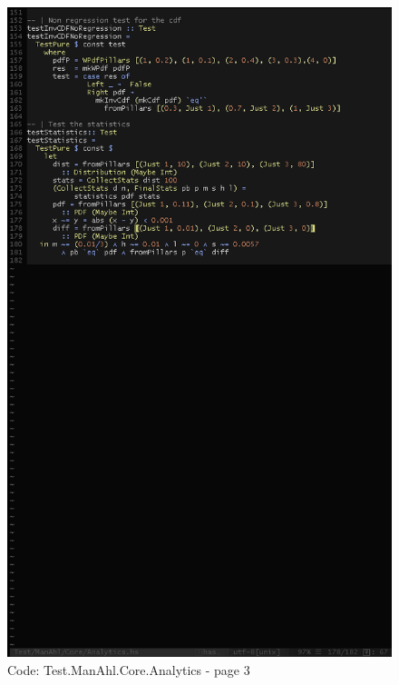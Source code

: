 \documentclass[12pt,a4paper,article]{memoir} %
\begin{document}
\begin{figure}[h!]
\centering
\includegraphics[width=1\textwidth]{img/code-test-analytics-3.png}
\caption{Code: Test.ManAhl.Core.Analytics - page 3}
\label{fig:test.a3}
\end{figure}
\end{document}
